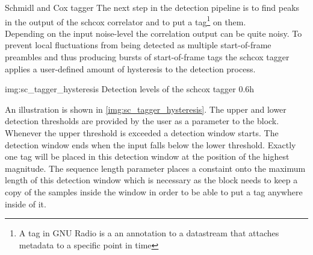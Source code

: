 \begin{subchapter}{Schmidl and Cox tagger}
  The next step in the detection pipeline is to find peaks in
  the output of the \acrlong{schcox} correlator and to put
  a tag\footnote{A tag in GNU Radio is a an annotation to a
  datastream that attaches metadata to a specific point in time}
  on them. \\

  Depending on the input noise-level the correlation output
  can be quite noisy. To prevent local fluctuations from being
  detected as multiple start-of-frame preambles and thus producing
  bursts of start-of-frame tags the \acrshort{schcox} tagger
  applies a user-defined amount of hysteresis to the detection
  process.

               {img:sc_tagger_hysteresis}
               {Detection levels of the \acrshort{schcox} tagger}
               {0.6}{h}

  An illustration is shown in \autoref{img:sc_tagger_hysteresis}.
  The upper and lower detection thresholds are provided by
  the user as a parameter to the block. \\

  Whenever the upper threshold is exceeded a detection window starts.
  The detection window ends when the input falls below the lower
  threshold.
  Exactly one tag will be placed in this detection window at
  the position of the highest magnitude.
  The sequence length parameter places a constaint onto the
  maximum length of this detection window which is necessary
  as the block needs to keep a copy of the samples inside the
  window in order to be able to put a tag anywhere inside of it.
\end{subchapter}

